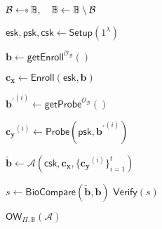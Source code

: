 \begin{figure}[h]
\centering

	\begin{minipage}[t]{0.55\textwidth}
	\begin{algorithm}[H]
	\caption{$\textsf{OW}_{\Pi, \mathbb{B}}(\mathcal{A})$}
	\label{alg:ow_game}
	\begin{algorithmic}[1]

		\State $\mathcal{B} \getsdollar \mathbb{B}, \quad \mathbb{B} \gets \mathbb{B} \setminus \mathcal{B}$

		\State $\textsf{esk}, \textsf{psk}, \textsf{csk} \gets \textsf{Setup}(1^\lambda)$

		\State $\mathbf{b} \gets \textsf{getEnroll}^{\mathcal{O}_{\mathcal{B}}}()$

		\State $\mathbf{c_x} \gets \textsf{Enroll}(\textsf{esk}, \mathbf{b})$


			\State ${\mathbf{b}^\prime}^{(i)} \gets \textsf{getProbe}^{\mathcal{O}_{\mathcal{B}}}() $
		
			\State $\mathbf{c_y}^{(i)} \gets \textsf{Probe}( \textsf{psk}, {\mathbf{b}^\prime}^{(i)} )$

		\EndFor
	
			\State $\mathbf{\tilde{b}} \gets \mathcal{A}( \textsf{csk}, \mathbf{c_x}, \{ \mathbf{c_y}^{(i)} \}_{i=1}^t )$

		\State $s \gets \textsf{BioCompare}( \mathbf{\tilde{b}}, \mathbf{b})$
		\State \Return $ \textsf{Verify}(s) $
	\end{algorithmic}
	\end{algorithm}
	\end{minipage}

\label{fig:ow_game}
\end{figure}



% 

\nocite{*}
\printbibliography



